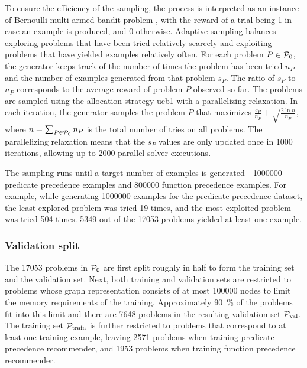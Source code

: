 To ensure the efficiency of the sampling, the process is interpreted as an instance of Bernoulli multi-armed bandit problem \cite{Sutton1998},
with the reward of a trial being 1 in case an example is produced, and 0 otherwise.
Adaptive sampling balances
exploring problems that have been tried relatively scarcely and
exploiting problems that have yielded examples relatively often.
For each problem $P \in \operatorname{\mathcal{P}_{0}}$,
the generator keeps track of the number of times the problem has been tried $n_P$
and the number of examples generated from that problem $s_P$.
The ratio of $s_P$ to $n_P$ corresponds to the average reward of problem $P$ observed so far.
The problems are sampled using the allocation strategy \acrshort{ucb1} \cite{Auer2002} with a parallelizing relaxation.
In each iteration, the generator samples the problem $P$ that maximizes
$\frac{s_P}{n_P} + \sqrt{\frac{2 \ln n}{n_P}}$,
where $n = \sum_{P \in \operatorname{\mathcal{P}_{0}}} n_P$ is the total number of tries on all problems.
The parallelizing relaxation means that the $s_P$ values are only updated once in \num{1000} iterations,
allowing up to \num{2000} parallel solver executions.

The sampling runs until a target number of examples is generated---\num{1000000} predicate precedence examples and \num{800000} function precedence examples.
For example, while generating \num{1000000} examples for the predicate precedence dataset,
the least explored problem was tried 19 times, and the most exploited problem was tried 504 times.
\num{5349} out of the \num{17053} problems yielded at least one example.

\subsubsection{Validation split}

The \num{17053} problems in $\operatorname{\mathcal{P}_{0}}$ are first split roughly in half to form the training set and the validation set.
Next, both training and validation sets are restricted
to problems whose graph representation consists of at most \num{100000} nodes
to limit the memory requirements of the training.
Approximately \SI{90}{\percent} of the problems fit into this limit
and there are \num{7648} problems in the resulting validation set $\operatorname{\mathcal{P}_{\mathrm{val}}}$.
The training set $\operatorname{\mathcal{P}_{\mathrm{train}}}$ is further restricted to problems that correspond to at least one training example,
leaving \num{2571} problems when training predicate precedence recommender,
and \num{1953} problems when training function precedence recommender.

